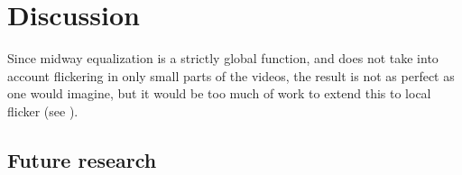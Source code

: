 \documentclass[Bachelorarbeit.tex]{subfiles}
\begin{document}
\newpage


\section{Discussion}
 \label{sec:discussion}
Since midway equalization is a strictly global function, and does not take into account flickering in only small parts of the videos, the result is not as perfect as one would imagine, but it would be too much of work to extend this to local flicker (see \cite{delon2010stabilization}).
\subsection*{Future research}
\end{document}
